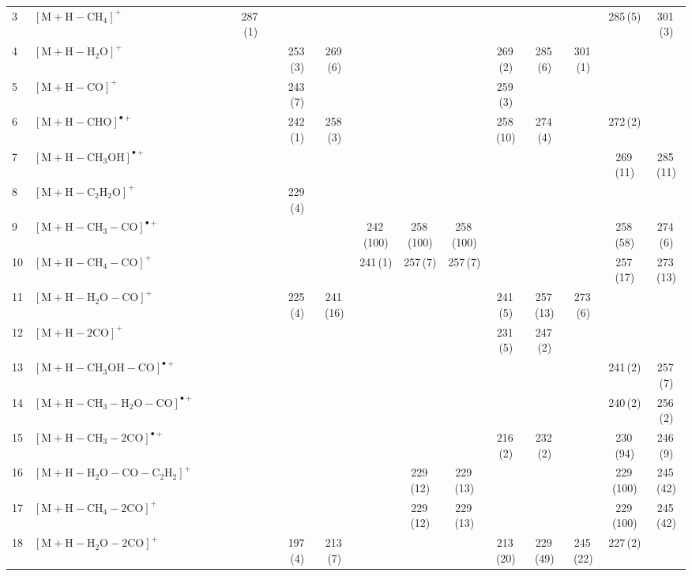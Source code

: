 \documentclass[]{article}
\begin{document}
\begin{table}
{\begin{tabular}{ll|ccccc|ccccc|ccccc}
  3 & $\mathrm{[M{+}H{-}CH_{4}]^+}$ &  &  &  & 287\,(1) &  &  &  &  &  &  &  &  &  & 285\,(5) & 301\,(3) \\ 
  4 & $\mathrm{[M{+}H{-}H_{2}O]^+}$ &  &  &  &  &  & 253\,(3) & 269\,(6) &  &  &  & 269\,(2) & 285\,(6) & 301\,(1) &  &  \\ 
  5 & $\mathrm{[M{+}H{-}CO]^+}$ &  &  &  &  &  & 243\,(7) &  &  &  &  & 259\,(3) &  &  &  &  \\ 
  6 & $\mathrm{[M{+}H{-}CHO]^{\bullet+}}$ &  &  &  &  &  & 242\,(1) & 258\,(3) &  &  &  & 258\,(10) & 274\,(4) &  & 272\,(2) &  \\ 
  7 & $\mathrm{[M{+}H{-}CH_{3}OH]^{\bullet+}}$ &  &  &  &  &  &  &  &  &  &  &  &  &  & 269\,(11) & 285\,(11) \\ 
  8 & $\mathrm{[M{+}H{-}C_{2}H_{2}O]^+}$ &  &  &  &  &  & 229\,(4) &  &  &  &  &  &  &  &  &  \\ 
  9 & $\mathrm{[M{+}H{-}CH_{3}{-}CO]^{\bullet+}}$ &  &  &  &  &  &  &  & 242\,(100) & 258\,(100) & 258\,(100) &  &  &  & 258\,(58) & 274\,(6) \\ 
  10 & $\mathrm{[M{+}H{-}CH_{4}{-}CO]^+}$ &  &  &  &  &  &  &  & 241\,(1) & 257\,(7) & 257\,(7) &  &  &  & 257\,(17) & 273\,(13) \\ 
  11 & $\mathrm{[M{+}H{-}H_{2}O{-}CO]^+}$ &  &  &  &  &  & 225\,(4) & 241\,(16) &  &  &  & 241\,(5) & 257\,(13) & 273\,(6) &  &  \\ 
  12 & $\mathrm{[M{+}H{-}2CO]^+}$ &  &  &  &  &  &  &  &  &  &  & 231\,(5) & 247\,(2) &  &  &  \\ 
  13 & $\mathrm{[M{+}H{-}CH_{3}OH{-}CO]^{\bullet+}}$ &  &  &  &  &  &  &  &  &  &  &  &  &  & 241\,(2) & 257\,(7) \\ 
  14 & $\mathrm{[M{+}H{-}CH_{3}{-}H_{2}O{-}CO]^{\bullet+}}$ &  &  &  &  &  &  &  &  &  &  &  &  &  & 240\,(2) & 256\,(2) \\ 
  15 & $\mathrm{[M{+}H{-}CH_{3}{-}2CO]^{\bullet+}}$ &  &  &  &  &  &  &  &  &  &  & 216\,(2) & 232\,(2) &  & 230\,(94) & 246\,(9) \\ 
  16 & $\mathrm{[M{+}H{-}H_{2}O{-}CO{-}C_{2}H_{2}]^+}$ &  &  &  &  &  &  &  &  & 229\,(12) & 229\,(13) &  &  &  & 229\,(100) & 245\,(42) \\ 
  17 & $\mathrm{[M{+}H{-}CH_{4}{-}2CO]^+}$ &  &  &  &  &  &  &  &  & 229\,(12) & 229\,(13) &  &  &  & 229\,(100) & 245\,(42) \\ 
  18 & $\mathrm{[M{+}H{-}H_{2}O{-}2CO]^+}$ &  &  &  &  &  & 197\,(4) & 213\,(7) &  &  &  & 213\,(20) & 229\,(49) & 245\,(22) & 227\,(2) &  \\ 

\end{tabular}}
\end{table}
\end{document}
